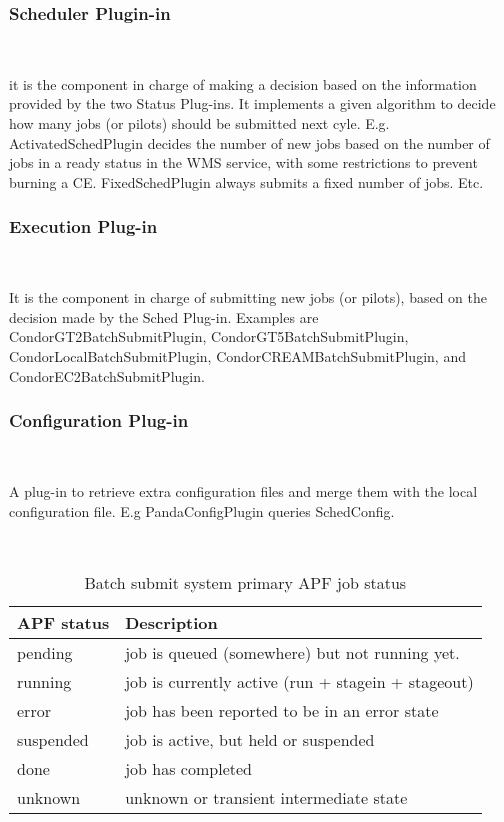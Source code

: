 \documentclass[a4paper]{jpconf}
\begin{document}
\subsubsection{Scheduler Plugin-in}

~

\noindent it is the component in charge of making a decision based on the information provided by the two Status Plug-ins. 
It implements a given algorithm to decide how many jobs (or pilots) should be submitted next cyle. 
E.g. ActivatedSchedPlugin decides the number of new jobs based on the number of jobs in a ready status in the WMS service, 
with some restrictions to prevent burning a CE. 
FixedSchedPlugin always submits a fixed number of jobs. Etc.

\subsubsection{Execution Plug-in}

~

\noindent It is the component in charge of submitting new jobs (or pilots), 
based on the decision made by the Sched Plug-in. 
Examples are CondorGT2BatchSubmitPlugin, CondorGT5BatchSubmitPlugin, CondorLocalBatchSubmitPlugin, CondorCREAMBatchSubmitPlugin, 
and CondorEC2BatchSubmitPlugin.

\subsubsection{Configuration Plug-in}

~

\noindent A plug-in to retrieve extra configuration files and merge them with the local configuration file.
E.g PandaConfigPlugin queries SchedConfig. 

~

\begin{table}
   \begin{center}
      \begin{tabular}{l l}
         \hline
         \textbf{APF status} & \textbf{Description} \\ 
         \hline
         pending      &     job is queued (somewhere) but not running yet.      \\  
         running      &     job is currently active (run + stagein + stageout)  \\ 
         error        &     job has been reported to be in an error state       \\ 
         suspended    &     job is active, but held or suspended                \\ 
         done         &     job has completed                                   \\ 
         unknown      &     unknown or transient intermediate state             \\ 
         \hline
      \end{tabular}
   \end{center}
   \caption{Batch submit system primary APF job status}
   \label{job secondary status}
\end{table}
\end{document}
